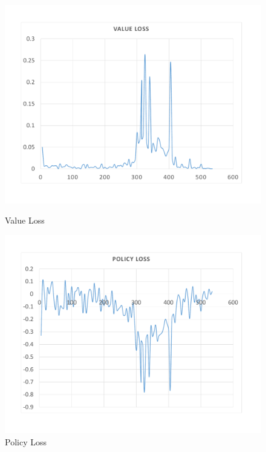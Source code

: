 \begin{figure}[H]
	\includegraphics[width=\linewidth]{Figures/ValueLoss}
	\caption{Value Loss}\label{fig:ValueLoss}
	\endminipage\hfill
	\includegraphics[width=\textwidth]{Figures/PolicyLoss}
	\caption{Policy Loss}
	\label{fig:PolicyLoss}
	\endminipage
\end{figure}
